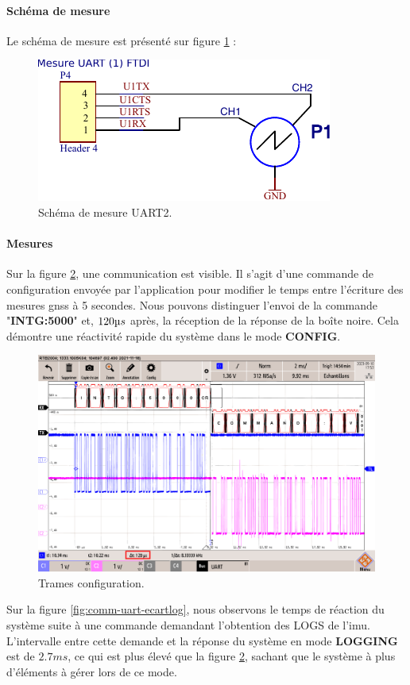 \paragraph{Schéma de mesure} Le schéma de mesure est présenté sur figure \ref{fig:schema-mesure-ftdi} : 
\begin{figure}[h]
	\centering
	\includegraphics[width=.4\linewidth]{../figures/mesures/UART-FTDI/Schema-mesure-FTDI}
	\caption{Schéma de mesure UART2.}
	\label{fig:schema-mesure-ftdi}
\end{figure}

\paragraph{Mesures} Sur la figure \ref{fig:comm-uart2-config}, une communication est visible. Il s'agit d'une commande de configuration envoyée par l'application pour modifier le temps entre l'écriture des mesures \gls{gnss} à 5 secondes. Nous pouvons distinguer l'envoi de la commande "\textbf{INTG:5000}" et, \underline{$120\micro s$} après, la réception de la réponse de la boîte noire. Cela démontre une réactivité rapide du système dans le mode \textbf{CONFIG}.


\begin{figure}[h]
	\centering
	\includegraphics[width=0.7\linewidth]{../figures/mesures/UART-FTDI/comm-uart2-config}
	\caption{Trames configuration.}
	\label{fig:comm-uart2-config}
\end{figure}

\clearpage

Sur la figure \ref{fig:comm-uart-ecartlog}, nous observons le temps de réaction du système suite à une commande demandant l'obtention des LOGS de l'\gls{imu}. L'intervalle entre cette demande et la réponse du système en mode \textbf{LOGGING} est de \underline{$2.7ms$}, ce qui est plus élevé que la figure \ref{fig:comm-uart2-config}, sachant que le système à plus d'éléments à gérer lors de ce mode.


